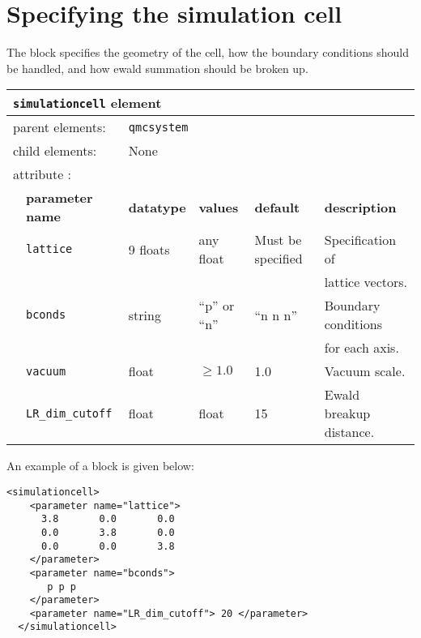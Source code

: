 \section{Specifying the simulation cell}
\label{chap:simulationcell}

The  block specifies the geometry of the cell, how the boundary conditions should be handled, and how ewald summation should be broken up.

\begin{table}[h]
\begin{center}
\begin{tabularx}{\textwidth}{l l l l l l }
\hline
\multicolumn{6}{l}{\texttt{simulationcell} element} \\
\hline
\multicolumn{2}{l}{parent elements:} & \multicolumn{4}{l}{\texttt{qmcsystem}}\\
\multicolumn{2}{l}{child  elements:} & \multicolumn{4}{l}{None}\\
\multicolumn{2}{l}{attribute      :} & \multicolumn{4}{l}{}\\
   &   \bfseries parameter name            & \bfseries datatype & \bfseries values & \bfseries default   & \bfseries description \\
\hline
   &   \texttt{lattice}  & 9 floats & any float & Must be specified & Specification of \\
   &                     &        &             &                   & lattice vectors. \\
   &   \texttt{bconds}   & string & ``p'' or ``n''  & ``n n n'' & Boundary conditions \\
   &                     &        &             &           & for each axis. \\
   &   \texttt{vacuum} & float & $\ge 1.0$ & 1.0        & Vacuum scale. \\
   &   \texttt{LR\_dim\_cutoff} & float & float & 15        & Ewald breakup distance. \\
\hline
\end{tabularx}
\end{center}
\end{table}

An example of a  block is given below:
\begin{lstlisting}[style=QMCPXML]
  <simulationcell>
    <parameter name="lattice">
      3.8       0.0       0.0
      0.0       3.8       0.0
      0.0       0.0       3.8
    </parameter>
    <parameter name="bconds">
       p p p
    </parameter>
    <parameter name="LR_dim_cutoff"> 20 </parameter>
  </simulationcell>
\end{lstlisting}

